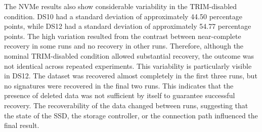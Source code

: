 The NVMe results also show considerable variability in the TRIM-disabled condition. DS10 had a standard deviation of approximately 44.50 percentage points, while DS12 
had a standard deviation of approximately 54.77 percentage points. The high variation resulted from the contrast between near-complete recovery in some runs and no 
recovery in other runs. Therefore, although the nominal TRIM-disabled condition allowed substantial recovery, the outcome was not identical across repeated experiments. 
This variability is particularly visible in DS12. The dataset was recovered almost completely in the first three runs, but no signatures were recovered in the final 
two runs. This indicates that the presence of deleted data was not sufficient by itself to guarantee successful recovery. The recoverability of the data changed between 
runs, suggesting that the state of the SSD, the storage controller, or the connection path influenced the final result.


